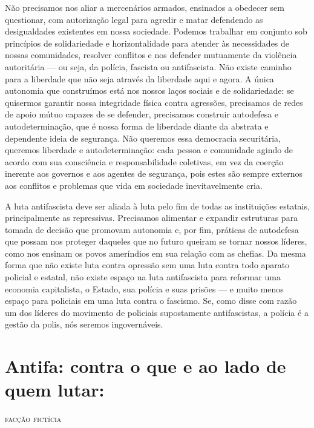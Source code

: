 Não precisamos nos aliar a mercenários armados, ensinados a obedecer sem questionar, com autorização legal para agredir e matar defendendo as desigualdades existentes em nossa sociedade. Podemos trabalhar em conjunto sob princípios de solidariedade e horizontalidade para atender às necessidades de nossas comunidades, resolver conflitos e nos defender mutuamente da violência autoritária --- ou seja, da polícia, fascista ou antifascista. Não existe caminho para a liberdade que não seja através da liberdade aqui e agora. A única autonomia que construímos está nos nossos laços sociais e de solidariedade: se quisermos garantir nossa integridade física contra agressões, precisamos de redes de apoio mútuo capazes de se defender, precisamos construir autodefesa e autodeterminação, que é nossa forma de liberdade diante da abstrata e dependente ideia de segurança. Não queremos essa democracia securitária, queremos liberdade e autodeterminação: cada pessoa e comunidade agindo de acordo com sua consciência e responsabilidade coletivas, em vez da coerção inerente aos governos e aos agentes de segurança, pois estes são sempre externos aos conflitos e problemas que vida em sociedade inevitavelmente cria.

A luta antifascista deve ser aliada à luta pelo fim de todas as instituições estatais, principalmente as repressivas. Precisamos alimentar e expandir estruturas para tomada de decisão que promovam autonomia e, por fim, práticas de autodefesa que possam nos proteger daqueles que no futuro queiram se tornar nossos líderes, como nos ensinam os povos ameríndios em sua relação com as chefias. Da mesma forma que não existe luta contra opressão sem uma luta contra todo aparato policial e estatal, não existe espaço na luta antifascista para reformar uma economia capitalista, o Estado, sua polícia e suas prisões --- e muito menos espaço para policiais em uma luta contra o fascismo. Se, como disse com razão um dos líderes do movimento de policiais supostamente antifascistas, a polícia é a gestão da polis, nós seremos ingovernáveis.

\chapter*{Antifa: contra o que e ao lado de quem lutar: }


\hfill{}\textsc{facção fictícia}

